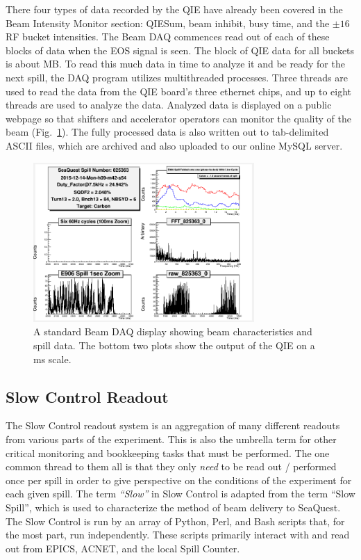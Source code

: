 There four types of data recorded by the QIE have already been covered in the Beam Intensity Monitor section: QIESum, beam inhibit, busy time, and the $\pm16$ RF bucket intensities. The Beam DAQ commences read out of each of these blocks of data when the EOS signal is seen. The block of QIE data for all buckets is about \unit[300]{MB}. To read this much data in time to analyze it and be ready for the next spill, the DAQ program utilizes multithreaded processes. Three threads are used to read the data from the QIE board's three ethernet chips, and up to eight threads are used to analyze the data. Analyzed data is displayed on a public webpage so that shifters and accelerator operators can monitor the quality of the beam (Fig.~\ref{fig:beamdaq}). The fully processed data is also written out to tab-delimited ASCII files, which are archived and also uploaded to our online MySQL server.

\begin{figure}
	\centering
	\includegraphics[width=0.75\textwidth]{figures/apparatus/E906FFT-scalerDAQ.png}
	\caption{A standard Beam DAQ display showing beam characteristics and spill data. The bottom two plots show the output of the QIE on a \unit[]{ms} scale.}
	\label{fig:beamdaq}
\end{figure}

\subsection{Slow Control Readout}

The Slow Control readout system is an aggregation of many different readouts from various parts of the experiment. This is also the umbrella term for other critical monitoring and bookkeeping tasks that must be performed. The one common thread to them all is that they only \emph{need} to be read out / performed once per spill in order to give perspective on the conditions of the experiment for each given spill. The term \emph{``Slow''} in Slow Control is adapted from the term ``Slow Spill'', which is used to characterize the method of beam delivery to SeaQuest. The Slow Control is run by an array of Python, Perl, and Bash scripts that, for the most part, run independently. These scripts primarily interact with and read out from EPICS, ACNET, and the local Spill Counter.

